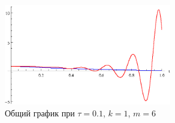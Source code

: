 \begin{figure}[h]
\begin{center}
\includegraphics[width=0.65\textwidth]{./3_results/1_13.eps}
\end{center}
\caption{Общий график при $\tau=0.1$, $k=1$, $m=6$}
\end{figure}